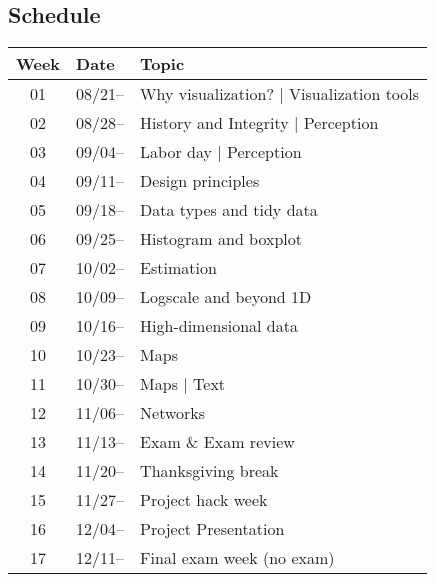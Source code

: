 \subsection{Schedule}\label{sub:schedule}%

\begin{tabular}{@{}cll@{}} \toprule
  Week & Date & Topic \\\midrule
  01 & 08/21-- & Why visualization? | Visualization tools \\
  02 & 08/28-- & History and Integrity | Perception \\
  03 & 09/04--  & Labor day | Perception \\
  04 & 09/11--  & Design principles \\
  05 & 09/18--  & Data types and tidy data \\
  06 & 09/25--  & Histogram and boxplot \\
  07 & 10/02--  & Estimation \\
  08 & 10/09--  & Logscale and beyond 1D \\
  09 & 10/16--  & High-dimensional data \\
  10 & 10/23--  & Maps \\
  11 & 10/30--  & Maps | Text \\
  12 & 11/06--  & Networks \\
  13 & 11/13--  & Exam \& Exam review\\
  14 & 11/20--  & Thanksgiving break \\
  15 & 11/27--  & Project hack week \\
  16 & 12/04--  & Project Presentation \\
  17 & 12/11--  & Final exam week (no exam) \\
  \bottomrule
\end{tabular}

